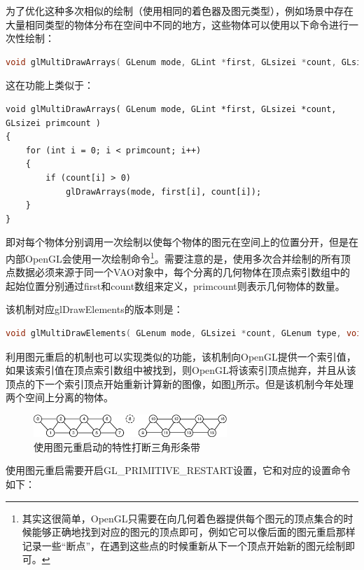 为了优化这种多次相似的绘制（使用相同的着色器及图元类型），例如场景中存在大量相同类型的物体分布在空间中不同的地方，这些物体可以使用以下命令进行一次性绘制：

\begin{lstlisting}[language=C++]
void glMultiDrawArrays​( GLenum mode​, GLint *first​, GLsizei *count​, GLsizei primcount​);
\end{lstlisting}

这在功能上类似于：

\begin{lstlisting}
void glMultiDrawArrays( GLenum mode, GLint *first, GLsizei *count, GLsizei primcount )
{
	for (int i = 0; i < primcount; i++)
	{
		if (count[i] > 0)
			glDrawArrays(mode, first[i], count[i]);
	}
}
\end{lstlisting}

即对每个物体分别调用一次绘制以使每个物体的图元在空间上的位置分开，但是在内部OpenGL会使用一次绘制命令\footnote{其实这很简单，OpenGL只需要在向几何着色器提供每个图元的顶点集合的时候能够正确地找到对应的图元的顶点即可，例如它可以像后面的图元重启那样记录一些“断点”，在遇到这些点的时候重新从下一个顶点开始新的图元绘制即可。}。需要注意的是，使用多次合并绘制的所有顶点数据必须来源于同一个VAO对象中，每个分离的几何物体在顶点索引数组中的起始位置分别通过first和count数组来定义，primcount则表示几何物体的数量。

该机制对应glDrawElements的版本则是：

\begin{lstlisting}[language=C++]
void glMultiDrawElements​( GLenum mode​, GLsizei *count​, GLenum type​, void **indices​, GLsizei primcount​ );
\end{lstlisting}

利用图元重启的机制也可以实现类似的功能，该机制向OpenGL提供一个索引值，如果该索引值在顶点索引数组中被找到，则OpenGL将该索引顶点抛弃，并且从该顶点的下一个索引顶点开始重新计算新的图像，如图\ref{f:api-primitive-restart}所示。但是该机制今年处理两个空间上分离的物体。

\begin{figure}
	\sidecaption
	\includegraphics[width=0.65\textwidth]{figures/api/primitive-restart}
	\caption{使用图元重启动的特性打断三角形条带}
	\label{f:api-primitive-restart}
\end{figure}

使用图元重启需要开启GL\_PRIMITIVE\_RESTART设置，它和对应的设置命令如下：

